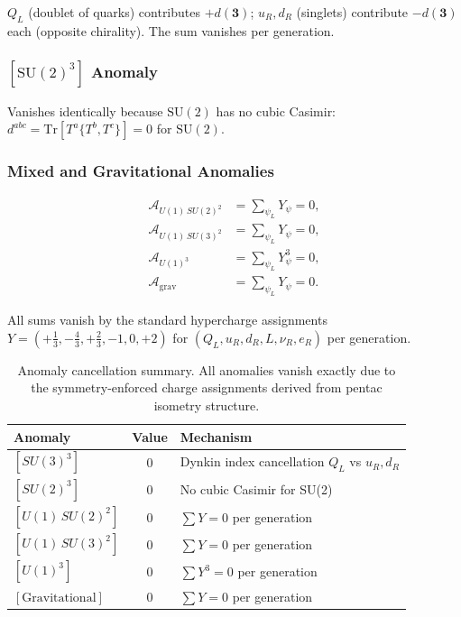 \documentclass[11pt]{article}
\begin{document}
$Q_L$ (doublet of quarks) contributes $+d(\mathbf{3})$;
$u_R,d_R$ (singlets) contribute $-d(\mathbf{3})$ each
(opposite chirality). The sum vanishes per generation.

\subsubsection{$[\mathrm{SU}(2)^3]$ Anomaly}

Vanishes identically because $\mathrm{SU}(2)$ has no
cubic Casimir: $d^{abc}=\mathrm{Tr}[T^a\{T^b,T^c\}]=0$
for $\mathrm{SU}(2)$.

\subsubsection{Mixed and Gravitational Anomalies}

\begin{align}
  \mathcal{A}_{U(1)\,SU(2)^2}
    &= \sum_{\psi_L} Y_\psi = 0, \\
  \mathcal{A}_{U(1)\,SU(3)^2}
    &= \sum_{\psi_L} Y_\psi = 0, \\
  \mathcal{A}_{U(1)^3}
    &= \sum_{\psi_L} Y_\psi^3 = 0, \\
  \mathcal{A}_\text{grav}
    &= \sum_{\psi_L} Y_\psi = 0.
\end{align}

All sums vanish by the standard hypercharge assignments
$Y = (+\tfrac{1}{3}, -\tfrac{4}{3}, +\tfrac{2}{3}, -1, 0, +2)$
for $(Q_L, u_R, d_R, L, \nu_R, e_R)$ per generation.

\begin{table}[htbp]
\centering
\caption{Anomaly cancellation summary. All anomalies vanish
exactly due to the symmetry-enforced charge assignments
derived from pentac isometry structure.}
\label{tab:anomaly}
\begin{tabular}{@{}lcl@{}}
\toprule
Anomaly & Value & Mechanism \\
\midrule
$[SU(3)^3]$            & $0$ & Dynkin index cancellation $Q_L$ vs $u_R,d_R$ \\
$[SU(2)^3]$            & $0$ & No cubic Casimir for SU(2) \\
$[U(1)\,SU(2)^2]$      & $0$ & $\sum Y = 0$ per generation \\
$[U(1)\,SU(3)^2]$      & $0$ & $\sum Y = 0$ per generation \\
$[U(1)^3]$             & $0$ & $\sum Y^3 = 0$ per generation \\
$[\text{Gravitational}]$ & $0$ & $\sum Y = 0$ per generation \\
\bottomrule
\end{tabular}
\end{table}
\end{document}
